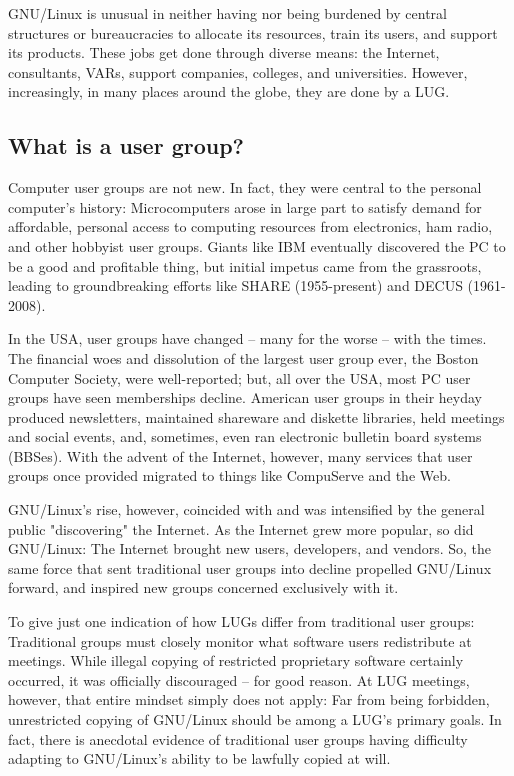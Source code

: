 GNU/Linux is unusual in neither having nor being burdened by central
structures or bureaucracies to allocate its resources, train its users,
and support its products. These jobs get done through diverse means: the
Internet, consultants, VARs, support companies, colleges, and
universities. However, increasingly, in many places around the globe,
they are done by a LUG.

\subsection{What is a user group?}

Computer user groups are not new. In
fact, they were central to the personal computer's history:
Microcomputers arose in large part to satisfy demand for affordable,
personal access to computing resources from electronics, ham radio, and
other hobbyist user groups.  Giants like IBM eventually discovered the
PC to be a good and profitable thing, but initial impetus came from the
grassroots, leading to groundbreaking efforts like SHARE (1955-present) 
and DECUS (1961-2008).

In the USA, user groups have changed -- many for the worse --
with the times. The financial woes and dissolution of the largest user
group ever, the Boston Computer Society, were well-reported; but, all
over the USA, most PC user groups have seen memberships decline.
American user groups in their heyday produced newsletters, maintained
shareware and diskette libraries, held meetings and social events, and,
sometimes, even ran electronic bulletin board systems (BBSes). With the
advent of the Internet, however, many services that user groups once
provided migrated to things like CompuServe and the Web.

GNU/Linux's rise, however, coincided with and was intensified by the
general public "discovering" the Internet. As the Internet grew more
popular, so did GNU/Linux: The Internet brought new users,
developers, and vendors. So, the same force that sent traditional user
groups into decline propelled GNU/Linux forward, and inspired new groups 
concerned exclusively with it. 

To give just one indication of how LUGs differ from traditional 
user groups: Traditional groups must closely 
monitor what software users redistribute at meetings.
While illegal copying of restricted proprietary software certainly
occurred, it was officially discouraged -- for good reason.
At LUG meetings, however, that entire mindset simply does not apply:
Far from being forbidden, unrestricted copying of GNU/Linux
should be among a LUG's primary goals.  In fact, there is anecdotal
evidence of traditional user groups having difficulty adapting to
GNU/Linux's ability to be lawfully copied at will.


